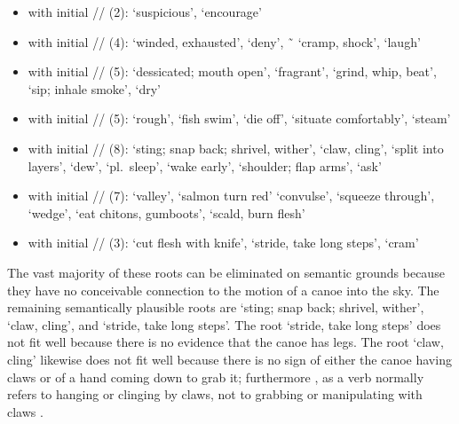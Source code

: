 \begin{itemize}
\item	with initial  // (2):
		 ‘suspicious’, 
		 ‘encourage’
\item	with initial  // (4):
		 ‘winded, exhausted’,
		 ‘deny’,
		 \~\  ‘cramp, shock’,
		 ‘laugh’
\item	with initial  // (5):
		 ‘dessicated; mouth open’,
		 ‘fragrant’,
		 ‘grind, whip, beat’,
		 ‘sip; inhale smoke’,
		 ‘dry’
\item	with initial  // (5):
		 ‘rough’,
		 ‘fish swim’,
		 ‘die off’,
		 ‘situate comfortably’,
		 ‘steam’
\item	with initial  // (8):
		 ‘sting; snap back; shrivel, wither’,
		 ‘claw, cling’,
		 ‘split into layers’,
		 ‘dew’,
		 ‘pl.\ sleep’,
		 ‘wake early’,
		 ‘shoulder; flap arms’,
		 ‘ask’
\item	with initial  // (7):
		 ‘valley’,
		 ‘salmon turn red’
		 ‘convulse’,
		 ‘squeeze through’,
		 ‘wedge’,
		 ‘eat chitons, gumboots’,
		 ‘scald, burn flesh’
\item	with initial  // (3):
		 ‘cut flesh with knife’,
		 ‘stride, take long steps’,
		 ‘cram’
\end{itemize}

The vast majority of these roots can be eliminated on semantic grounds because they have no conceivable connection to the motion of a canoe into the sky.
The remaining semantically plausible roots are  ‘sting; snap back; shrivel, wither’,  ‘claw, cling’, and  ‘stride, take long steps’.
The root  ‘stride, take long steps’ does not fit well because there is no evidence that the canoe has legs.
The root  ‘claw, cling’ likewise does not fit well because there is no sign of either the canoe having claws or of a hand coming down to grab it; furthermore , as a verb normally refers to hanging or clinging by claws, not to grabbing or manipulating with claws \parencite[791]{leer:1976}.

